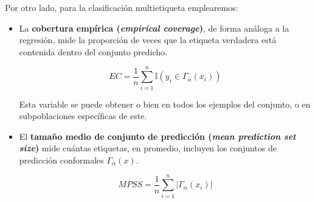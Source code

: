 Por otro lado, para la clasificación multietiqueta emplearemos:

\begin{itemize}

    \item La \textbf{cobertura empírica (\textit{empirical coverage})}, de forma análoga a la regresión, mide la proporción de veces que la etiqueta verdadera está contenida dentro del conjunto predicho.

    $$
    EC = \frac{1}{n} \sum_{i=1}^{n} \mathbb{I}(y_i \in \Gamma_\alpha(x_i))
    $$

    Esta variable se puede obtener o bien en todos los ejemplos del conjunto, o en subpoblaciones específicas de este.





    \item El \textbf{tamaño medio de conjunto de predicción (\textit{mean prediction set size})} mide cuántas etiquetas, en promedio, incluyen los conjuntos de predicción conformales $\Gamma_\alpha(x)$.

    $$
    MPSS = \frac{1}{n} \sum_{i=1}^n | \Gamma_\alpha(x_i) |
    $$


    
\end{itemize}


